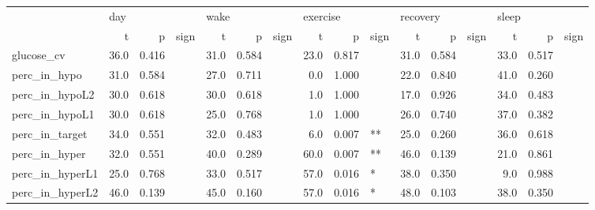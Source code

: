 \begin{tabular}{lrrlrrlrrlrrlrrl}
\toprule
{} & \multicolumn{3}{l}{day} & \multicolumn{3}{l}{wake} & \multicolumn{3}{l}{exercise} & \multicolumn{3}{l}{recovery} & \multicolumn{3}{l}{sleep} \\
{} &     t &      p & sign &     t &      p & sign &        t &      p & sign &        t &      p & sign &     t &      p & sign \\
\midrule
glucose_cv      &  36.0 &  0.416 &      &  31.0 &  0.584 &      &     23.0 &  0.817 &      &     31.0 &  0.584 &      &  33.0 &  0.517 &      \\
perc_in_hypo    &  31.0 &  0.584 &      &  27.0 &  0.711 &      &      0.0 &  1.000 &      &     22.0 &  0.840 &      &  41.0 &  0.260 &      \\
perc_in_hypoL2  &  30.0 &  0.618 &      &  30.0 &  0.618 &      &      1.0 &  1.000 &      &     17.0 &  0.926 &      &  34.0 &  0.483 &      \\
perc_in_hypoL1  &  30.0 &  0.618 &      &  25.0 &  0.768 &      &      1.0 &  1.000 &      &     26.0 &  0.740 &      &  37.0 &  0.382 &      \\
perc_in_target  &  34.0 &  0.551 &      &  32.0 &  0.483 &      &      6.0 &  0.007 &   ** &     25.0 &  0.260 &      &  36.0 &  0.618 &      \\
perc_in_hyper   &  32.0 &  0.551 &      &  40.0 &  0.289 &      &     60.0 &  0.007 &   ** &     46.0 &  0.139 &      &  21.0 &  0.861 &      \\
perc_in_hyperL1 &  25.0 &  0.768 &      &  33.0 &  0.517 &      &     57.0 &  0.016 &    * &     38.0 &  0.350 &      &   9.0 &  0.988 &      \\
perc_in_hyperL2 &  46.0 &  0.139 &      &  45.0 &  0.160 &      &     57.0 &  0.016 &    * &     48.0 &  0.103 &      &  38.0 &  0.350 &      \\
\bottomrule
\end{tabular}
